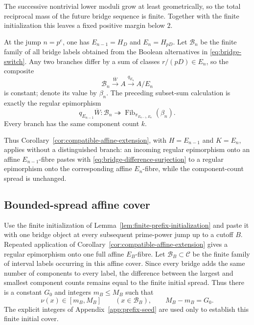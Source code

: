 The successive nontrivial lower moduli grow at least geometrically, so the total reciprocal mass of the future bridge sequence is finite.  Together with the finite initialization this leaves a fixed positive margin below $2$.

At the jump $n=p^e$, one has $E_{n-1}=H_D$ and $E_n=H_{pD}$.  Let $\mathscr B_n$ be the finite family of all bridge labels obtained from the Boolean alternatives in \eqref{eq:bridge-switch}.  Any two branches differ by a sum of classes $r/(pD)\in E_n$, so the composite
\[
\mathscr B_n\xrightarrow{\overline W}A\xrightarrow{q_{E_n}}A/E_n
\]
is constant; denote its value by $\beta_n$.  The preceding subset-sum calculation is exactly the regular epimorphism
\begin{equation}\label{eq:bridge-difference-surjection}
q_{E_{n-1}}\overline W:
\mathscr B_n\twoheadrightarrow
\operatorname{Fib}_{\pi_{E_{n-1},E_n}}(\beta_n).
\end{equation}
Every branch has the same component count $k$.

Thus Corollary~\ref{cor:compatible-affine-extension}, with $H=E_{n-1}$ and $K=E_n$, applies without a distinguished branch: an incoming regular epimorphism onto an affine $E_{n-1}$-fibre pastes with \eqref{eq:bridge-difference-surjection} to a regular epimorphism onto the corresponding affine $E_n$-fibre, while the component-count spread is unchanged.

\subsection{Bounded-spread affine cover}

Use the finite initialization of Lemma~\ref{lem:finite-prefix-initialization} and paste it with one bridge object at every subsequent prime-power jump up to a cutoff $B$.  Repeated application of Corollary~\ref{cor:compatible-affine-extension} gives a regular epimorphism onto one full affine $E_B$-fibre.  Let $\mathcal B_B\subset\mathcal C$ be the finite family of interval labels occurring in this affine cover.  Since every bridge adds the same number of components to every label, the difference between the largest and smallest component counts remains equal to the finite initial spread.  Thus there is a constant $G_0$ and integers $m_B\le M_B$ such that
\begin{equation}\label{eq:ragged-spread}
\nu(x)\in[m_B,M_B]
\qquad(x\in\mathcal B_B),
\qquad
M_B-m_B=G_0.
\end{equation}
The explicit integers of Appendix~\ref{app:prefix-seed} are used only to establish this finite initial cover.

